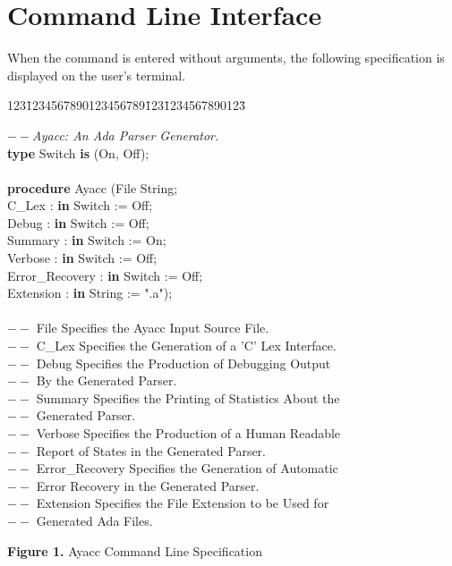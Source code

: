 \section{Command Line Interface}
{\samepage
When the \ayacc command is entered without arguments, the following
specification is displayed on the user's terminal.
\begin{tabbing}
123\=1234567890123456789\=123\=1234567890123\= \kill

\>   $--${\it Ayacc: An Ada Parser Generator.}\\
\>  {\bf type} Switch {\bf is} (On, Off);\\
\\
\>  {\bf procedure} Ayacc (\>File  \>  String;\\
\>\>                      C\_Lex \>\>     : {\bf in} Switch := Off;\\
\>\>                      Debug  \>\>    : {\bf in} Switch := Off;\\
\>\>                      Summary \>\>   : {\bf in} Switch := On;\\
\>\>                      Verbose \>\>   : {\bf in} Switch := Off;\\
\>\>                      Error\_Recovery\>\> :  {\bf in} Switch := Off;\\
\>\>                      Extension \>\> : {\bf in} String := ".a");\\
\\
\>   $--$ File \>Specifies the Ayacc Input Source File.\\
\>   $--$ C\_Lex\> Specifies the Generation of a 'C' Lex Interface.\\
\>   $--$ Debug\>      Specifies the Production of Debugging Output\\
\>   $--$ \>\>           By the Generated Parser.\\
\>   $--$ Summary\>    Specifies the Printing of Statistics About the\\
\>   $--$\>\>              Generated Parser.\\
\>   $--$ Verbose\>    Specifies the Production of a Human Readable\\
\>   $--$ \>\>             Report of States in the Generated Parser.\\
\>   $--$ Error\_Recovery\>   Specifies the Generation of Automatic\\
\>   $--$ \>\>             Error Recovery in the Generated Parser.\\
\>   $--$ Extension\>  Specifies the File Extension to be Used for\\
\>   $--$   \>\>           Generated Ada Files.
\end{tabbing}
\centerline{{\bf Figure 1.} Ayacc Command Line Specification}
}
\newpage
